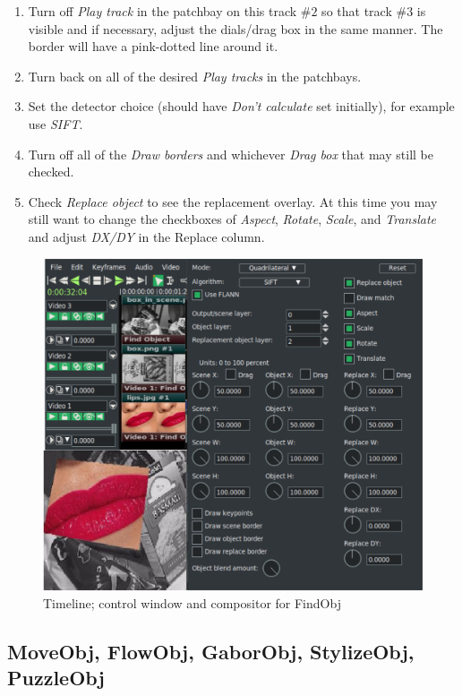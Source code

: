 \begin{enumerate}
    \item Turn off \textit{Play track} in the patchbay on this track $\#2$ so that track $\#3$ is visible and if necessary, adjust the dials/drag box in the same manner. The border will have a pink-dotted line around it.
    \item Turn back on all of the desired \textit{Play tracks} in the patchbays.
    \item Set the detector choice (should have \textit{Don’t calculate} set initially), for example use \textit{SIFT}.
    \item Turn off all of the \textit{Draw borders} and whichever \textit{Drag box} that may still be checked.
    \item Check \textit{Replace object} to see the replacement overlay. At this time you may still want to change the checkboxes of \textit{Aspect}, \textit{Rotate}, \textit{Scale}, and \textit{Translate} and adjust \textit{DX/DY} in the Replace column.
\end{enumerate}

\begin{figure}[htpb]
    \centering
    \includegraphics[width=0.9\linewidth]{images/findobj.png}
    \caption{Timeline; control window and compositor for FindObj}
    \label{fig:findobj}
\end{figure}

\subsection{MoveObj, FlowObj, GaborObj, StylizeObj, PuzzleObj}%
\label{sub:move_flow_gabor_stylize_puzzle}

